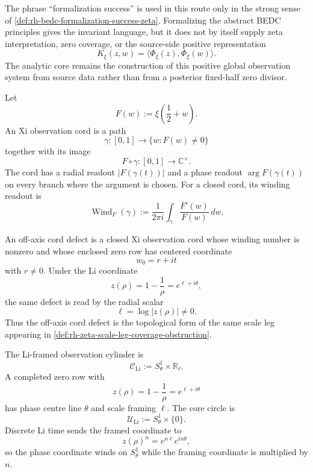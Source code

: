 \begin{principle}
\label{prin:rh-strong-formalization-success-meaning}
The phrase ``formalization success'' is used in this route only in the
strong sense of
\autoref{def:rh-bedc-formalization-success-zeta}.  Formalizing the
abstract BEDC principles gives the invariant language, but it does not
by itself supply zeta interpretation, zero coverage, or the source-side
positive representation
$$
K_{\xi}(z,w)=\langle\Phi_{\xi}(z),\Phi_{\xi}(w)\rangle.
$$
The analytic core remains the construction of this positive global
observation system from source data rather than from a posterior
fixed-half zero divisor.
\end{principle}

\begin{definition}
\label{def:rh-xi-observation-cord}
Let
$$
F(w):=\xi\left(\frac12+w\right).
$$
An Xi observation cord is a path
$$
\gamma:[0,1]\to\{w:F(w)\ne0\}
$$
together with its image
$$
F\circ\gamma:[0,1]\to\mathbb C^\times.
$$
The cord has a radial readout $|F(\gamma(t))|$ and a phase readout
$\arg F(\gamma(t))$ on every branch where the argument is chosen.  For a
closed cord, its winding readout is
$$
\operatorname{Wind}_{F}(\gamma)
:=
\frac{1}{2\pi i}\int_{\gamma}\frac{F'(w)}{F(w)}\,dw.
$$
\end{definition}

\begin{definition}
\label{def:rh-off-axis-cord-defect}
An off-axis cord defect is a closed Xi observation cord whose winding
number is nonzero and whose enclosed zero row has centered coordinate
$$
w_0=r+it
$$
with $r\ne0$.  Under the Li coordinate
$$
z(\rho)=1-\frac1\rho=e^{\ell+i\theta},
$$
the same defect is read by the radial scalar
$$
\ell=\log|z(\rho)|\ne0.
$$
Thus the off-axis cord defect is the topological form of the same scale
leg appearing in
\autoref{def:rh-zeta-scale-leg-coverage-obstruction}.
\end{definition}

\begin{definition}
\label{def:rh-li-framed-observation-cylinder}
The Li-framed observation cylinder is
$$
\mathcal C_{\mathrm{Li}}
:=
S^1_{\theta}\times\mathbb R_{\ell}.
$$
A completed zero row with
$$
z(\rho)=1-\frac1\rho=e^{\ell+i\theta}
$$
has phase centre line $\theta$ and scale framing $\ell$.  The core
circle is
$$
\mathcal U_{\mathrm{Li}}
:=
S^1_{\theta}\times\{0\}.
$$
Discrete Li time sends the framed coordinate to
$$
z(\rho)^n=e^{n\ell}e^{in\theta},
$$
so the phase coordinate winds on $S^1_{\theta}$ while the framing
coordinate is multiplied by $n$.
\end{definition}

